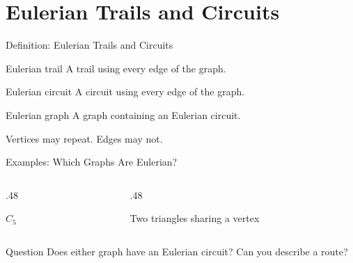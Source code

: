 \documentclass[aspectratio=169,11pt]{beamer}
\begin{document}
\section{Eulerian Trails and Circuits}
\begin{frame}{Definition: Eulerian Trails and Circuits}
\large
\begin{block}{Eulerian trail}
A trail using every edge of the graph.
\end{block}
\begin{block}{Eulerian circuit}
A circuit using every edge of the graph.
\end{block}
\begin{block}{Eulerian graph}
A graph containing an Eulerian circuit.
\end{block}
\medskip Vertices may repeat. Edges may not.
\end{frame}

\begin{frame}{Examples: Which Graphs Are Eulerian?}
\large
\begin{columns}[c,onlytextwidth]\begin{column}{.48\textwidth}\begin{center}\end{center}\begin{center}$C_5$\end{center}\end{column}\begin{column}{.48\textwidth}\begin{center}\end{center}\begin{center}Two triangles sharing a vertex\end{center}\end{column}\end{columns}\begin{block}{Question}
Does either graph have an Eulerian circuit? Can you describe a route?
\end{block}

\end{frame}
\end{document}
